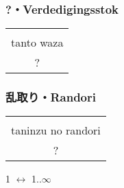 \subsubsection{?・Verdedigingsstok}
\begin{table}[H]
\begin{center}
\begin{tabular}{c}
    \ruby{}{}\\
    tanto waza\\
    ?
\end{tabular}
\end{center}
\label{kyuu_1_defense_stick}
\end{table}

\subsubsection{乱取り・Randori}
\begin{table}[H]
\begin{center}
\begin{tabular}{c}
    \ruby{}{}\\
    taninzu no randori\\
    ?
\end{tabular}
\end{center}
\label{kyuu_1_randori}
\end{table}
\begin{center}
    1 $\leftrightarrow$ 1..$\infty$
\end{center}
